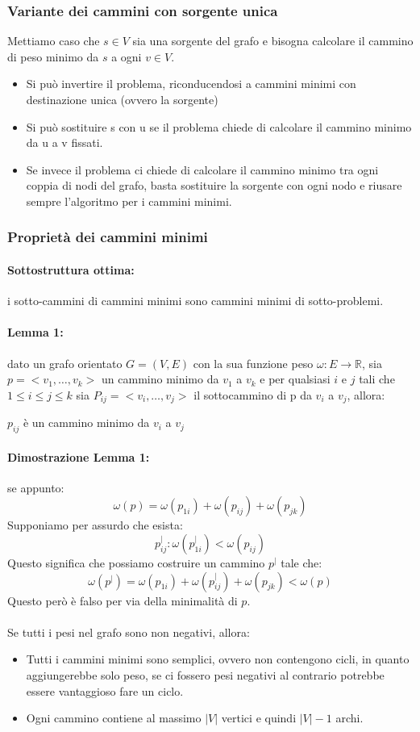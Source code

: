 \documentclass[a4paper,12pt]{article}
\begin{document}
\subsubsection{Variante dei cammini con sorgente unica}
Mettiamo caso che $s \in V$ sia una sorgente del grafo e bisogna calcolare il cammino di peso minimo da $s$ a ogni $v \in V$.\\
\begin{itemize}
    \item Si può invertire il problema, riconducendosi a cammini minimi con destinazione unica (ovvero la sorgente)
    \item Si può sostituire s con u se il problema chiede di calcolare il cammino minimo da u a v fissati.
    \item Se invece il problema ci chiede di calcolare il cammino minimo tra ogni coppia di nodi del grafo, basta sostituire la sorgente con ogni nodo e riusare sempre l'algoritmo per i cammini minimi.
\end{itemize}
\subsubsection{Proprietà dei cammini minimi}
\paragraph{Sottostruttura ottima:} i sotto-cammini di cammini minimi sono cammini minimi di sotto-problemi.
\paragraph{Lemma 1:} dato un grafo orientato $G  = (V,E)$ con la sua funzione peso $\omega : E \to \mathbb{R}$, sia $p = <v_1,\ldots,v_k>$ un cammino minimo da $v_1$ a $v_k$ e per qualsiasi $i$ e $j$ tali che $1 \leq i \leq j \leq k$ sia $P_{ij} = <v_i,\ldots,v_j>$ il sottocammino di p da $v_i$ a $v_j$, allora:
\begin{center}
    $p_{ij}$ è un cammino minimo da $v_i$ a $v_j$
\end{center}
\paragraph{Dimostrazione Lemma 1:} se appunto:
\[
\omega(p) = \omega(p_{1i}) + \omega(p_{ij}) + \omega(p_{jk})
\]
Supponiamo per assurdo che esista:
\[
p^|_{ij} : \omega(p^|_{1i}) < \omega(p_{ij})
\]
Questo significa che possiamo costruire un cammino $p^|$ tale che:
\[
\omega(p^|) = \omega(p_{1i}) + \omega(p^|_{ij}) + \omega(p_{jk}) < \omega(p)
\]
Questo però è falso per via della minimalità di $p$.\\\\
Se tutti i pesi nel grafo sono non negativi, allora:
\begin{itemize}
    \item Tutti i cammini minimi sono semplici, ovvero non contengono cicli, in quanto aggiungerebbe solo peso, se ci fossero pesi negativi al contrario potrebbe essere vantaggioso fare un ciclo.
    \item Ogni cammino contiene al massimo $|V|$ vertici e quindi $|V| - 1$ archi.
\end{itemize}
\end{document}
